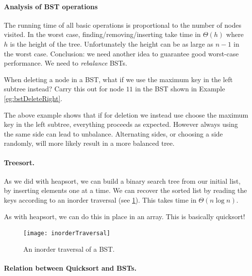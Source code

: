 \paragraph{Analysis of BST operations}

The running time of all basic operations is proportional to the number of 
nodes visited. In the worst case, finding/removing/inserting take time in $\Theta(h)$ 
where $h$ is the height of the tree. Unfortunately the height can be as large 
as $n-1$ in the worst case. Conclusion: we need another idea to guarantee good worst-case 
performance. We need to \emph{rebalance} BSTs.

\begin{Boxample}[5] \label{eg:bstDeleteLeft}
When deleting a node  in a BST, what if we use the maximum key in the left subtree instead?
Carry this out for node $11$ in the BST shown in Example \ref{eg:bstDeleteRight}.

\end{Boxample}


The above example shows that if for deletion we instead use choose the maximum key in the left subtree, everything proceeds as expected. 
However always using the same side can lead to unbalance. Alternating sides, or choosing a side randomly, will more likely  result in a more 
balanced tree.


\paragraph{Treesort.}

As we did with heapsort, we can build a binary search tree from our initial list, by inserting elements one at a time. 
We can recover the sorted list by reading the keys according to an inorder traversal (see \cref{fig:inorderTraversal}). 
This takes time in $\Theta(n \log n)$.

As with heapsort, we can do this in place in an array. This is basically quicksort!

\begin{figure}[htb]
  \centering
  \texttt{[image: inorderTraversal]}
  \caption{An inorder traversal of a BST.}
  \label{fig:inorderTraversal}
\end{figure}


\paragraph{Relation between Quicksort and BSTs.}

